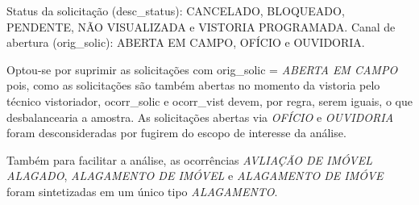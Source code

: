 \documentclass[
]{article}
\newenvironment{Shaded}{\begin{snugshade}}{\end{snugshade}}
\newcommand{\NormalTok}[1]{#1}
\newcommand{\OperatorTok}[1]{\textcolor[rgb]{0.81,0.36,0.00}{\textbf{#1}}}
\newcommand{\StringTok}[1]{\textcolor[rgb]{0.31,0.60,0.02}{#1}}
\begin{document}
Status da solicitação (desc\_status): CANCELADO, BLOQUEADO, PENDENTE,
NÃO VISUALIZADA e VISTORIA PROGRAMADA. Canal de abertura (orig\_solic):
ABERTA EM CAMPO, OFÍCIO e OUVIDORIA.

Optou-se por suprimir as solicitações com orig\_solic = \emph{ABERTA EM
CAMPO} pois, como as solicitações são também abertas no momento da
vistoria pelo técnico vistoriador, ocorr\_solic e ocorr\_vist devem, por
regra, serem iguais, o que desbalancearia a amostra. As solicitações
abertas via \emph{OFÍCIO} e \emph{OUVIDORIA} foram desconsideradas por
fugirem do escopo de interesse da análise.

\begin{Shaded}
\end{Shaded}

Também para facilitar a análise, as ocorrências \emph{AVLIAÇÃO DE IMÓVEL
ALAGADO}, \emph{ALAGAMENTO DE IMÓVEL} e \emph{ALAGAMENTO DE IMÓVE} foram
sintetizadas em um único tipo \emph{ALAGAMENTO}.
\end{document}
